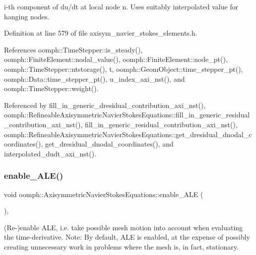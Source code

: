 i-\/th component of du/dt at local node n. Uses suitably interpolated value for hanging nodes. 



Definition at line 579 of file axisym\+\_\+navier\+\_\+stokes\+\_\+elements.\+h.



References oomph\+::\+Time\+Stepper\+::is\+\_\+steady(), oomph\+::\+Finite\+Element\+::nodal\+\_\+value(), oomph\+::\+Finite\+Element\+::node\+\_\+pt(), oomph\+::\+Time\+Stepper\+::ntstorage(), t, oomph\+::\+Geom\+Object\+::time\+\_\+stepper\+\_\+pt(), oomph\+::\+Data\+::time\+\_\+stepper\+\_\+pt(), u\+\_\+index\+\_\+axi\+\_\+nst(), and oomph\+::\+Time\+Stepper\+::weight().



Referenced by fill\+\_\+in\+\_\+generic\+\_\+dresidual\+\_\+contribution\+\_\+axi\+\_\+nst(), oomph\+::\+Refineable\+Axisymmetric\+Navier\+Stokes\+Equations\+::fill\+\_\+in\+\_\+generic\+\_\+residual\+\_\+contribution\+\_\+axi\+\_\+nst(), fill\+\_\+in\+\_\+generic\+\_\+residual\+\_\+contribution\+\_\+axi\+\_\+nst(), oomph\+::\+Refineable\+Axisymmetric\+Navier\+Stokes\+Equations\+::get\+\_\+dresidual\+\_\+dnodal\+\_\+coordinates(), get\+\_\+dresidual\+\_\+dnodal\+\_\+coordinates(), and interpolated\+\_\+dudt\+\_\+axi\+\_\+nst().

\mbox{\label{classoomph_1_1AxisymmetricNavierStokesEquations_ac5b7a740769b0e5cb1e95db6dab34800}} 
\subsubsection{\texorpdfstring{enable\+\_\+\+A\+L\+E()}{enable\_ALE()}}
{\footnotesize\ttfamily void oomph\+::\+Axisymmetric\+Navier\+Stokes\+Equations\+::enable\+\_\+\+A\+LE (\begin{DoxyParamCaption}{ }\end{DoxyParamCaption})\hspace{0.3cm}{\ttfamily [inline]}, {\ttfamily [virtual]}}



(Re-\/)enable A\+LE, i.\+e. take possible mesh motion into account when evaluating the time-\/derivative. Note\+: By default, A\+LE is enabled, at the expense of possibly creating unnecessary work in problems where the mesh is, in fact, stationary. 



